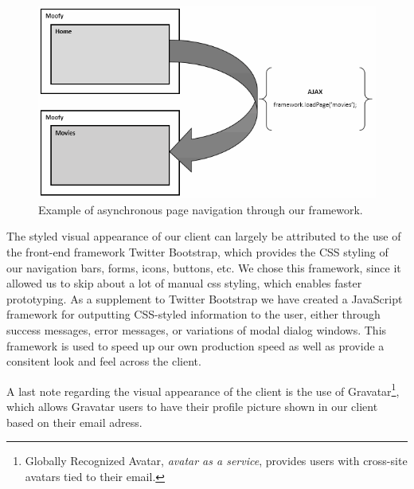 \begin{figure}[hbt]
	\centering
	\centerline{\includegraphics[scale=0.7]{./p1design/ajax.png}}
	\caption{Example of asynchronous page navigation through our framework.}
	\label{fig:ajax}
\end{figure}

The styled visual appearance of our client can largely be attributed to the use of the front-end framework Twitter Bootstrap, which provides the CSS styling of our navigation bars, forms, icons, buttons, etc. We chose this framework, since it allowed us to skip about a lot of manual css styling, which enables faster prototyping. As a supplement to Twitter Bootstrap we have created a JavaScript framework for outputting CSS-styled information to the user, either through success messages, error messages, or variations of modal dialog windows. This framework is used to speed up our own production speed as well as provide a consitent look and feel across the client.

A last note regarding the visual appearance of the client is the use of Gravatar\footnote{Globally Recognized Avatar, \emph{avatar as a service}, provides users with cross-site avatars tied to their email.}, which allows Gravatar users to have their profile picture shown in our client based on their email adress.

